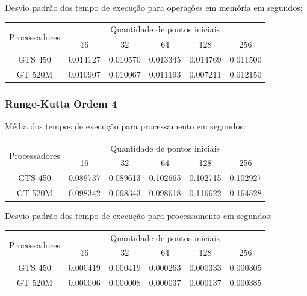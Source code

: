     \hspace{1mm}\newline
    
    \noindent Desvio padrão dos tempo de execução para operações em memória em segundos:\\
    \begin{tabular}{| c | c | c | c | c | c |}
      \hline
      \multirow{2}{*}{Processadores}& \multicolumn{5}{|c|}{Quantidade de pontos iniciais} \\ \cline{2-6}
      & 16 & 32 & 64 & 128 & 256 \\ \hline
      GTS 450 & 0.014127 & 0.010570 & 0.013345 & 0.014769 & 0.011500 \\ \hline
      GT 520M & 0.010907 & 0.010067 & 0.011193 & 0.007211 & 0.012150 \\ \hline

      \hline
    \end{tabular}
    
    \subsubsection{Runge-Kutta Ordem 4} 
    Média dos tempos de execução para processamento em segundos:\\
    \begin{tabular}{| c | c | c | c | c | c |}
      \hline
      \multirow{2}{*}{Processadores}& \multicolumn{5}{|c|}{Quantidade de pontos iniciais} \\ \cline{2-6}
      & 16 & 32 & 64 & 128 & 256 \\ \hline
      GTS 450 & 0.089737 & 0.089613 & 0.102665 & 0.102715 & 0.102927\\ \hline
      GT 520M & 0.098342 & 0.098343 & 0.098618 & 0.116622 & 0.164528\\ \hline

      \hline
    \end{tabular}
    
    \hspace{1mm}\newline
    
    \noindent Desvio padrão dos tempo de execução para processamento em segundos:\\
    \begin{tabular}{| c | c | c | c | c | c |}
      \hline
      \multirow{2}{*}{Processadores}& \multicolumn{5}{|c|}{Quantidade de pontos iniciais} \\ \cline{2-6}
      & 16 & 32 & 64 & 128 & 256 \\ \hline
      GTS 450 & 0.000419 & 0.000419 & 0.000263 & 0.000333 & 0.000305 \\ \hline
      GT 520M & 0.000006 & 0.000008 & 0.000037 & 0.000137 & 0.000385 \\ \hline

      \hline
    \end{tabular}
    
